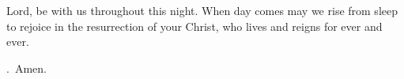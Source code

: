 \lettrine[loversize=0.15,lines=2]{L}{}ord,
be with us throughout this night.
When day comes may we rise from sleep
to rejoice in the resurrection of your Christ,
who lives and reigns for ever and ever.
\par \Rbar.~Amen.
